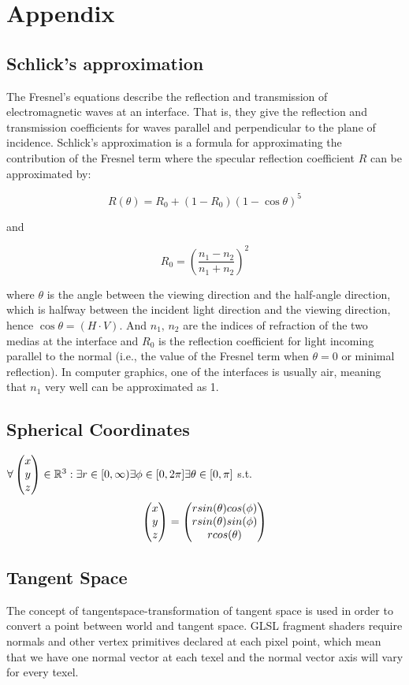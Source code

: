 \chapter{Appendix}
\section{Schlick's approximation}
The Fresnel's equations describe the reflection and transmission of electromagnetic waves at an interface. That is, they give the reflection and transmission coefficients for waves parallel and perpendicular to the plane of incidence. Schlick's approximation is a formula for approximating the contribution of the Fresnel term where the specular reflection coefficient $R$ can be approximated by:

\begin{equation}
 R(\theta) = R_0 + (1 - R_0)(1 - \cos \theta)^5
\label{eq:schlickapprox}
\end{equation}

and

\begin{equation*}
  R_0 = \left(\frac{n_1-n_2}{n_1+n_2}\right)^2
\end{equation*}

where $\theta$ is the angle between the viewing direction and the half-angle direction, which is halfway between the incident 
light direction and the viewing direction, hence $\cos\theta=(H\cdot V)$. And $n_1,\,n_2$ are the indices of refraction of the two medias at the interface and $R_0$ is the reflection coefficient for light incoming parallel to the normal (i.e., the value of the Fresnel term when $\theta = 0$ or minimal reflection). In computer graphics, one of the interfaces is usually air, meaning that $n_1$ very well can be approximated as 1.

\section{Spherical Coordinates}
\label{sec:sphericalcoordinates}
$\forall \colvec[x]{y}{z} \in \mathbb{R}^3 : \exists r \in [0,\infty) \exists \phi \in [0,2\pi] \exists \theta \in [0,\pi] $ s.t.
\begin{equation*}
\colvec[x]{y}{z} = \colvec[r sin(\theta)cos(\phi)]{r sin(\theta)sin(\phi)}{r cos(\theta)}
\label{eq:sphericalcoordinates}
\end{equation*}


\section{Tangent Space}
\label{sec:tangentspace}
The concept of tangentspace-transformation of tangent space is used in order to convert a point between world and tangent space. GLSL fragment shaders require normals and other vertex primitives declared at each pixel point, which mean that we have one normal vector at each texel and the normal vector axis will vary for every texel. 


